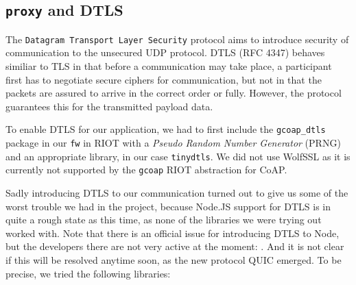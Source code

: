 \documentclass[acmtog, language=english, nonacm]{acmart}
\begin{document}
    \label{subsec:proxy_and_dtls} \subsection{\texttt{proxy} and DTLS}

    The \texttt{Datagram Transport Layer Security} protocol aims to introduce security of communication to the unsecured UDP protocol. DTLS (RFC 4347) behaves similiar to TLS in that before a communication may take place, a participant first has to negotiate secure ciphers for communication, but not in that the packets are assured to arrive in the correct order or fully. However, the protocol guarantees this for the transmitted payload data.

    To enable DTLS for our application, we had to first include the \texttt{gcoap\_dtls} package in our \texttt{fw} in RIOT with a \emph{Pseudo Random Number Generator} (PRNG) and an appropriate library, in our case \texttt{tinydtls}. We did not use WolfSSL as it is currently not supported by the \texttt{gcoap} RIOT abstraction for CoAP.
    
    Sadly introducing DTLS to our communication turned out to give us some of the worst trouble we had in the project, because Node.JS support for DTLS is in quite a rough state as this time, as none of the libraries we were trying out worked with. Note that there is an official issue for introducing DTLS to Node, but the developers there are not very active at the moment: \cite{node-dtls-issue}. And it is not clear if this will be resolved anytime soon, as the new protocol QUIC emerged. To be precise, we tried the following libraries:
\end{document}
